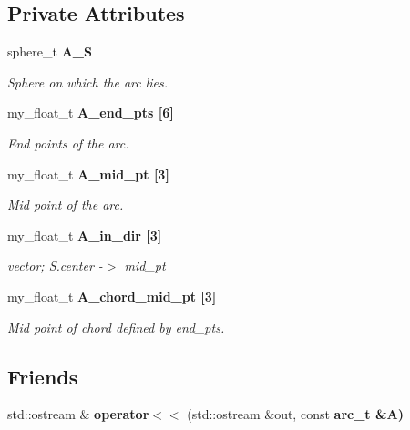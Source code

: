 \subsection*{Private Attributes}
\begin{CompactItemize}
\item 
sphere\_\-t \bf{A\_\-S}\label{classASCbase_1_1geometry_1_1arc__t_61808b252a9a77e07388ef89cb717781}

\begin{CompactList}\small\item\em Sphere on which the arc lies. \item\end{CompactList}\item 
my\_\-float\_\-t \bf{A\_\-end\_\-pts} [6]\label{classASCbase_1_1geometry_1_1arc__t_23ed7beb59a38ee8e970536506e46429}

\begin{CompactList}\small\item\em End points of the arc. \item\end{CompactList}\item 
my\_\-float\_\-t \bf{A\_\-mid\_\-pt} [3]\label{classASCbase_1_1geometry_1_1arc__t_abb892372174ae16d4485cd46ceb5aac}

\begin{CompactList}\small\item\em Mid point of the arc. \item\end{CompactList}\item 
my\_\-float\_\-t \bf{A\_\-in\_\-dir} [3]\label{classASCbase_1_1geometry_1_1arc__t_a945c545c3b2ac14757f8cc6bf9326df}

\begin{CompactList}\small\item\em vector; S.center -$>$ mid\_\-pt \item\end{CompactList}\item 
my\_\-float\_\-t \bf{A\_\-chord\_\-mid\_\-pt} [3]\label{classASCbase_1_1geometry_1_1arc__t_e5da612f0b29559898b76854005028f7}

\begin{CompactList}\small\item\em Mid point of chord defined by end\_\-pts. \item\end{CompactList}\end{CompactItemize}
\subsection*{Friends}
\begin{CompactItemize}
\item 
std::ostream \& \textbf{operator$<$$<$} (std::ostream \&out, const \bf{arc\_\-t} \&A)\label{classASCbase_1_1geometry_1_1arc__t_448902453ee3eb5a63e4bcfd54c2c5b8}

\end{CompactItemize}


